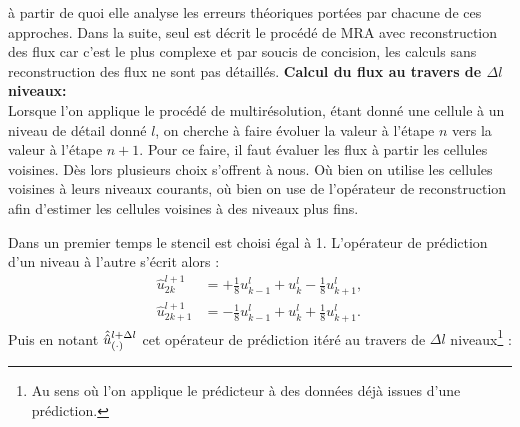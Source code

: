             à partir de quoi elle analyse les erreurs théoriques portées par chacune de ces approches.
            Dans la suite, seul est décrit le procédé de MRA avec reconstruction des flux car c'est le plus complexe et par soucis de concision, les calculs sans reconstruction des flux ne sont pas détaillés.
            \textbf{Calcul du flux au travers de $\Delta l$ niveaux:\\}
            Lorsque l'on applique le procédé de multirésolution, étant donné une cellule à un niveau de détail donné $l$, on cherche à faire évoluer la valeur à l'étape $n$ vers la valeur à l'étape $n+1$. 
            Pour ce faire, il faut évaluer les flux à partir les cellules voisines. Dès lors plusieurs choix s'offrent à nous. Où bien on utilise les cellules voisines à leurs niveaux courants, où bien on use de l'opérateur 
            de reconstruction afin d'estimer les cellules voisines à des niveaux plus fins.\par
            Dans un premier temps le stencil est choisi égal à 1. L'opérateur de prédiction d'un niveau à l'autre s'écrit alors : 
            \begin{align}
                \hat u^{l+1}_{2k} &= +\frac{1}{8} u^l_{k-1} + u^l_k - \frac{1}{8} u^l_{k+1},\\
                \hat u^{l+1}_{2k+1} &= -\frac{1}{8} u^l_{k-1} + u^l_k + \frac{1}{8} u^l_{k+1}.
            \end{align}
            Puis en notant $\hat{\hat{u}}^{l+\Delta l}_{(\cdot)}$ cet opérateur de prédiction itéré au travers de $\Delta l$ niveaux\footnote{
                Au sens où l'on applique le prédicteur à des données déjà issues d'une prédiction.
            } : 
